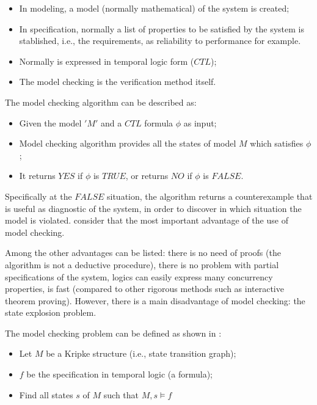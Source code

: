 \begin{itemize}
\item In modeling, a model (normally mathematical) of the system is created; 
\item In specification, normally a list of properties to be satisfied by the system is stablished, i.e., the requirements, as reliability to performance for example. \item Normally is expressed in temporal logic form ($CTL$); 
\item The model checking is the verification method itself. 
\end{itemize}

The model checking algorithm can be described as:  

\begin{itemize}
\item Given the model $ 'M' $ and a $CTL$ formula $ \phi $ as input;  
\item Model checking algorithm provides all the states of model $ M $ which satisfies $ \phi $;  
\item It returns $YES$ if $ \phi $ is $TRUE$, or returns $NO$ if $ \phi $ is $FALSE$.  

\end{itemize}
Specifically at the $FALSE$ situation, the algorithm returns a counterexample that is useful as diagnostic of the system, in order to discover in which situation the model is violated. \cite{Clarke2008} consider that the most important advantage of the use of model checking.  
 
Among the other advantages can be listed: there is no need of proofs (the algorithm is not a deductive procedure), there is no problem with partial specifications of the system, logics can easily express many concurrency properties, is fast (compared to other rigorous methods such as interactive theorem proving). However, there is a main disadvantage of model checking: the state explosion problem. 

The model checking problem can be defined as shown in \cite{Clarke2008}: 

\begin{itemize}
\item Let $M$ be a Kripke structure (i.e., state transition graph);
\item $f$ be the specification in temporal logic (a formula);
\item Find all states $s$ of $M$ such that $M , s \models f$
\end{itemize}

